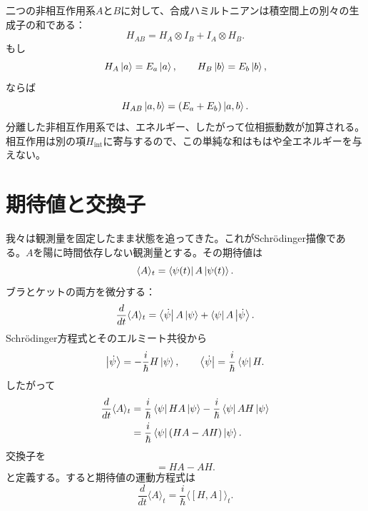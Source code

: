 二つの非相互作用系\(A\)と\(B\)に対して、合成ハミルトニアンは積空間上の別々の生成子の和である：
\begin{equation}
H_{AB}
=
H_A\otimes I_B+I_A\otimes H_B.
\end{equation}
もし
\begin{equation}
H_A\left\lvert a\right\rangle=E_a\left\lvert a\right\rangle,
\qquad
H_B\left\lvert b\right\rangle=E_b\left\lvert b\right\rangle,
\end{equation}
ならば
\begin{equation}
H_{AB}\left\lvert a,b\right\rangle=(E_a+E_b)\left\lvert a,b\right\rangle.
\end{equation}
分離した非相互作用系では、エネルギー、したがって位相振動数が加算される。相互作用は別の項\(H_{\mathrm{int}}\)に寄与するので、この単純な和はもはや全エネルギーを与えない。

\begin{classroomqa}
\end{classroomqa}

\section{期待値と交換子}

我々は観測量を固定したまま状態を追ってきた。これがSchr\"odinger描像である。\(A\)を陽に時間依存しない観測量とする。その期待値は
\begin{equation}
\langle A\rangle_t
=
\left\langle\psi(t)\right\rvert A\left\lvert\psi(t)\right\rangle.
\end{equation}
ブラとケットの両方を微分する：
\begin{equation}
\frac{d}{dt}\langle A\rangle_t
=
\left\langle\dot\psi\right\rvert A\left\lvert\psi\right\rangle
+
\left\langle\psi\right\rvert A\left\lvert\dot\psi\right\rangle.
\end{equation}
Schr\"odinger方程式とそのエルミート共役から
\begin{equation}
\left\lvert\dot\psi\right\rangle
=-\frac{i}{\hbar}H\left\lvert\psi\right\rangle,
\qquad
\left\langle\dot\psi\right\rvert
=\frac{i}{\hbar}\left\langle\psi\right\rvert H.
\end{equation}
したがって
\begin{align}
\frac{d}{dt}\langle A\rangle_t
&=
\frac{i}{\hbar}\left\langle\psi\right\rvert HA\left\lvert\psi\right\rangle
-\frac{i}{\hbar}\left\langle\psi\right\rvert AH\left\lvert\psi\right\rangle \\
&=
\frac{i}{\hbar}\left\langle\psi\right\rvert(HA-AH)\left\lvert\psi\right\rangle.
\end{align}
交換子を
\begin{equation}
[H,A]=HA-AH.
\end{equation}
と定義する。すると期待値の運動方程式は
\begin{equation}
\boxed{
\frac{d}{dt}\langle A\rangle_t
=
\frac{i}{\hbar}\langle[H,A]\rangle_t
}.
\end{equation}

